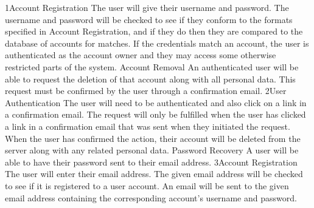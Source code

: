			{1}{Account Registration}
			{The user will give their username and password.}
			{The username and password will be checked to see if they conform 
			to the formats specified in Account Registration, and if they do 
			then they are compared to the database of accounts for matches.}
			{If the credentials match an account, the user is authenticated as 
			the account owner and they may access some otherwise restricted 
			parts of the system.}
		\funcreq
			{Account Removal}
			{An authenticated user will be able to request the deletion of 
			that account along with all personal data. This request must be 
			confirmed by the user through a confirmation email.}
			{2}{User Authentication}
			{The user will need to be authenticated and also click on a link 
			in a confirmation email.}
			{The request will only be fulfilled when the user has clicked a 
			link in a confirmation email that was sent when they initiated the 
			request.}
			{When the user has confirmed the action, their account will be 
			deleted from the server along with any related personal data.}
		\funcreq
			{Password Recovery}
			{A user will be able to have their password sent to their email 
			address.}
			{3}{Account Registration}
			{The user will enter their email address.}
			{The given email address will be checked to see if it is 
			registered to a user account.}
			{An email will be sent to the given email address containing the 
			corresponding account's username and password.}
